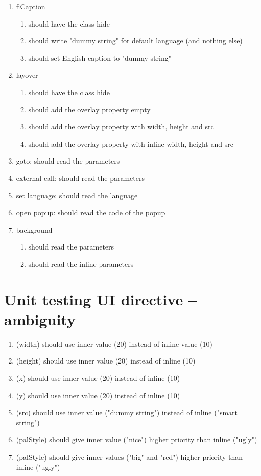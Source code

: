 \begin{singlespace}
\begin{enumerate}
\item     flCaption
\begin{enumerate}
\item         should have the class hide
\item         should write "dummy string" for default language (and nothing else)
\item         should set English caption to "dummy string"
\end{enumerate}
\item     layover
\begin{enumerate}
\item         should have the class hide
\item         should add the overlay property empty
\item         should add the overlay property with width, height and src
\item         should add the overlay property with inline width, height and src
\end{enumerate}
\item     goto: should read the parameters
\item     external call: should read the parameters
\item     set language: should read the language
\item     open popup: should read the code of the popup
\item     background
\begin{enumerate}
\item         should read the parameters
\item         should read the inline parameters
\end{enumerate}
\end{enumerate}

\section*{Unit testing UI directive -- ambiguity}
\begin{enumerate}
\item     (width) should use inner value (20) instead of inline value (10)
\item     (height) should use inner value (20) instead of inline (10)
\item     (x) should use inner value (20) instead of inline (10)
\item     (y) should use inner value (20) instead of inline (10)
\item     (src) should use inner value ("dummy string") instead of inline ("smart string")
\item     (palStyle) should give inner value ("nice") higher priority than inline ("ugly")
\item     (palStyle) should give inner values ("big" and "red") higher priority than inline ("ugly")
\end{enumerate}


\end{singlespace}
